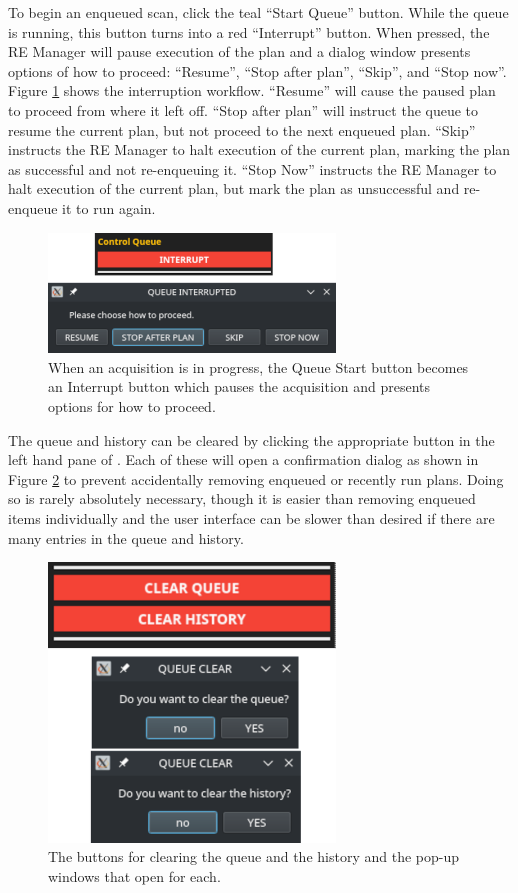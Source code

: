 To begin an enqueued scan, click the teal ``Start Queue'' button.
While the queue is running, this button turns into a red ``Interrupt'' button.
When pressed, the RE Manager will pause execution of the plan and a dialog window presents options of how to proceed: ``Resume'', ``Stop after plan'', ``Skip'', and ``Stop now''.
Figure \ref{acq:fig:queue_interrupt} shows the interruption workflow.
``Resume'' will cause the paused plan to proceed from where it left off.
``Stop after plan'' will instruct the queue to resume the current plan, but not proceed to the next enqueued plan.
``Skip'' instructs the RE Manager to halt execution of the current plan, marking the plan as successful and not re-enqueuing it.
``Stop Now'' instructs the RE Manager to halt execution of the current plan, but mark the plan as unsuccessful and re-enqueue it to run again.

\begin{figure}
\includegraphics[width=3in]{"acquisition/images/queue_interrupted"}
\caption[The Interrupt Workflow]{
	When an acquisition is in progress, the Queue Start button becomes an Interrupt button which pauses the acquisition and presents options for how to proceed.
}
\label{acq:fig:queue_interrupt}
\end{figure}

The queue and history can be cleared by clicking the appropriate button in the left hand pane of \blueskycmds.
Each of these will open a confirmation dialog as shown in Figure \ref{acq:fig:queue_clear} to prevent accidentally removing enqueued or recently run plans.
Doing so is rarely absolutely necessary, though it is easier than removing enqueued items individually and the user interface can be slower than desired if there are many entries in the queue and history.

\begin{figure}
\includegraphics[width=3in]{"acquisition/images/queue_clear"}
\caption[The Queue and History Clear Workflow]{
	The buttons for clearing the queue and the history and the pop-up windows that open for each.
}
\label{acq:fig:queue_clear}
\end{figure}

